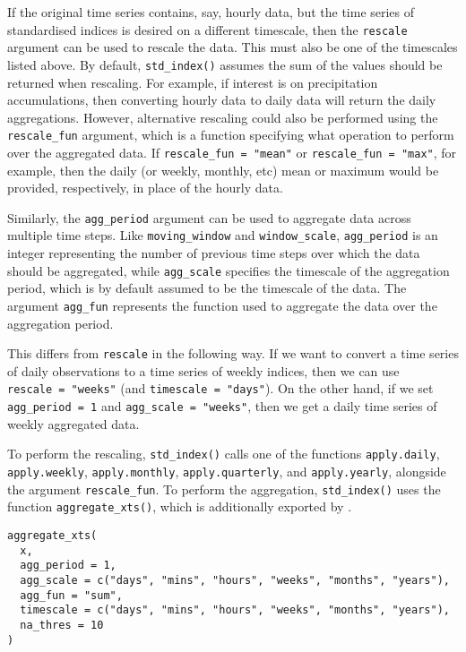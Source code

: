 If the original time series contains, say, hourly data, but the time series of standardised indices is desired on a different timescale, then the \texttt{rescale} argument can be used to rescale the data. This must also be one of the timescales listed above. By default, \texttt{std\_index()} assumes the sum of the values should be returned when rescaling. For example, if interest is on precipitation accumulations, then converting hourly data to daily data will return the daily aggregations. However, alternative rescaling could also be performed using the \texttt{rescale\_fun} argument, which is a function specifying what operation to perform over the aggregated data. If \texttt{rescale\_fun\ =\ "mean"} or \texttt{rescale\_fun\ =\ "max"}, for example, then the daily (or weekly, monthly, etc) mean or maximum would be provided, respectively, in place of the hourly data.

Similarly, the \texttt{agg\_period} argument can be used to aggregate data across multiple time steps. Like \texttt{moving\_window} and \texttt{window\_scale}, \texttt{agg\_period} is an integer representing the number of previous time steps over which the data should be aggregated, while \texttt{agg\_scale} specifies the timescale of the aggregation period, which is by default assumed to be the timescale of the data. The argument \texttt{agg\_fun} represents the function used to aggregate the data over the aggregation period.

This differs from \texttt{rescale} in the following way. If we want to convert a time series of daily observations to a time series of weekly indices, then we can use \texttt{rescale\ =\ "weeks"} (and \texttt{timescale\ =\ "days"}). On the other hand, if we set \texttt{agg\_period\ =\ 1} and \texttt{agg\_scale\ =\ "weeks"}, then we get a daily time series of weekly aggregated data.

To perform the rescaling, \texttt{std\_index()} calls one of the  functions \texttt{apply.daily}, \texttt{apply.weekly}, \texttt{apply.monthly}, \texttt{apply.quarterly}, and \texttt{apply.yearly}, alongside the argument \texttt{rescale\_fun}. To perform the aggregation, \texttt{std\_index()} uses the function \texttt{aggregate\_xts()}, which is additionally exported by .

\begin{verbatim}
aggregate_xts(
  x,
  agg_period = 1,
  agg_scale = c("days", "mins", "hours", "weeks", "months", "years"),
  agg_fun = "sum",
  timescale = c("days", "mins", "hours", "weeks", "months", "years"),
  na_thres = 10
)
\end{verbatim}

